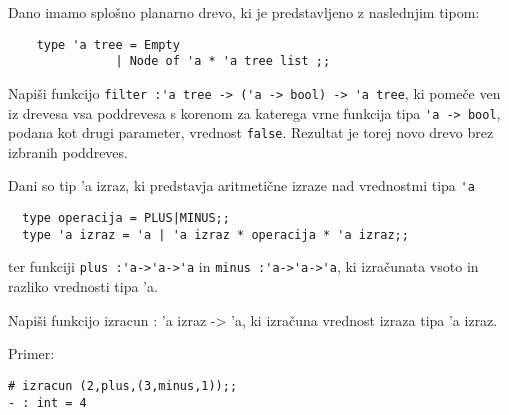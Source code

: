 \begin{ex}
Dano imamo splo\v sno planarno drevo, ki je predstavljeno z naslednjim tipom:

\begin{lstlisting}
	type 'a tree = Empty 
               | Node of 'a * 'a tree list ;; 
\end{lstlisting}
Napi\v si funkcijo 
\lstinline{filter :'a tree -> ('a -> bool) -> 'a tree}, 
ki pome\v ce ven iz drevesa vsa poddrevesa s korenom za katerega vrne funkcija tipa 
\lstinline{'a -> bool},
podana kot drugi parameter, vrednost \lstinline{false}. Rezultat je torej novo drevo brez izbranih poddreves. 
\end{ex}
\begin{ex}
  Dani so tip 'a izraz, ki predstavja aritmeti\v cne izraze nad
  vrednostmi tipa \lstinline{'a}
\begin{lstlisting}
  type operacija = PLUS|MINUS;;
  type 'a izraz = 'a | 'a izraz * operacija * 'a izraz;;
\end{lstlisting}
  ter funkciji 
  \lstinline{plus :'a->'a->'a} in
  \lstinline{minus :'a->'a->'a}, 
  ki izra\v cunata vsoto in
  razliko vrednosti tipa 'a.

  Napi\v si funkcijo izracun : 'a izraz -> 'a, ki izra\v cuna vrednost
  izraza tipa 'a izraz.

\noindent\/Primer:
\begin{lstlisting}
# izracun (2,plus,(3,minus,1));;
- : int = 4
\end{lstlisting} 

\end{ex} 

